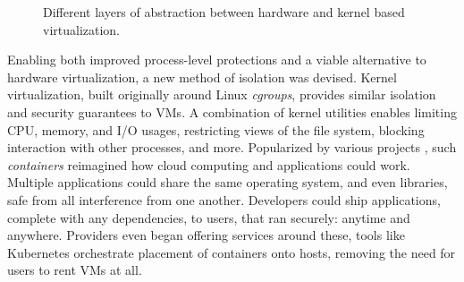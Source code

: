 \begin{figure}
  \caption{Different layers of abstraction between hardware and kernel based virtualization.}
  \label{fig:docker-vs-vms}
\end{figure}

Enabling both improved process-level protections and a viable alternative to hardware virtualization, a new method of isolation was devised.
Kernel virtualization, built originally around Linux \textit{cgroups}, provides similar isolation and security guarantees to VMs.
A combination of kernel utilities enables limiting CPU, memory, and I/O usages, restricting views of the file system, blocking interaction with other processes, and more.
Popularized by various projects \cite{oci,docker-main}, such \textit{containers} reimagined how cloud computing and applications could work.
Multiple applications could share the same operating system, and even libraries, safe from all interference from one another.
Developers could ship applications, complete with any dependencies, to users, that ran securely: anytime and anywhere.
Providers even began offering services around these, tools like Kubernetes \cite{kubernetes} orchestrate placement of containers onto hosts, removing the need for users to rent VMs at all.
